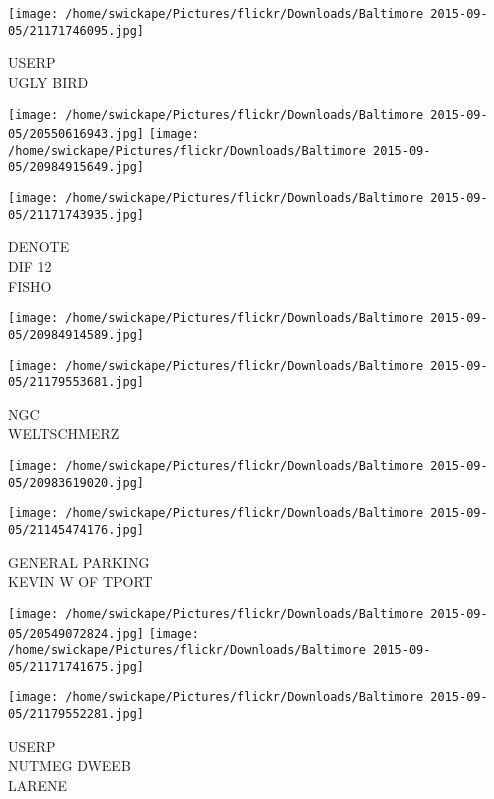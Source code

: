 \documentclass[10pt,letterpaper]{article}
\begin{document}
\vspace{0.25in}
\texttt{[image: /home/swickape/Pictures/flickr/Downloads/Baltimore 2015-09-05/21171746095.jpg]}

USERP\\
UGLY BIRD\\
\pagebreak

\texttt{[image: /home/swickape/Pictures/flickr/Downloads/Baltimore 2015-09-05/20550616943.jpg]}
\texttt{[image: /home/swickape/Pictures/flickr/Downloads/Baltimore 2015-09-05/20984915649.jpg]}

\texttt{[image: /home/swickape/Pictures/flickr/Downloads/Baltimore 2015-09-05/21171743935.jpg]}

DENOTE\\
DIF 12\\
FISHO\\
\pagebreak

\texttt{[image: /home/swickape/Pictures/flickr/Downloads/Baltimore 2015-09-05/20984914589.jpg]}

\vspace{0.25in}
\texttt{[image: /home/swickape/Pictures/flickr/Downloads/Baltimore 2015-09-05/21179553681.jpg]}

NGC\\
WELTSCHMERZ\\
\pagebreak

\texttt{[image: /home/swickape/Pictures/flickr/Downloads/Baltimore 2015-09-05/20983619020.jpg]}

\vspace{0.25in}
\texttt{[image: /home/swickape/Pictures/flickr/Downloads/Baltimore 2015-09-05/21145474176.jpg]}

GENERAL PARKING\\
KEVIN W OF TPORT\\
\pagebreak

\texttt{[image: /home/swickape/Pictures/flickr/Downloads/Baltimore 2015-09-05/20549072824.jpg]}
\texttt{[image: /home/swickape/Pictures/flickr/Downloads/Baltimore 2015-09-05/21171741675.jpg]}

\vspace{0.25in}
\texttt{[image: /home/swickape/Pictures/flickr/Downloads/Baltimore 2015-09-05/21179552281.jpg]}

USERP\\
NUTMEG DWEEB\\
LARENE\\
\pagebreak
\end{document}
